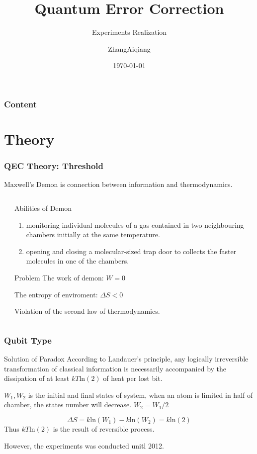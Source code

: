 \documentclass[aspectratio=169,10pt]{beamer}
\title{Quantum Error Correction}
\subtitle{Experiments Realization}
\author{ZhangAiqiang}
\institute{Tsinghua University}
\date{\today}
\begin{document}
\begin{frame}
    \titlepage
\end{frame}
\begin{frame}
    \frametitle{Content}
    \tableofcontents
\end{frame}
\section{Theory}
\begin{frame}
    \frametitle{QEC Theory: Threshold}
    Maxwell's Demon is connection between information and thermodynamics.
    \begin{columns}
        \begin{column}{0.35\textwidth}
        \end{column}
        \begin{column}{0.7\textwidth}
            \begin{block}{Abilities of Demon}
            \begin{enumerate}
                \item monitoring individual molecules of a gas contained in two neighbouring chambers initially at the same temperature.
                \item opening and closing a molecular-sized trap door to collects the faster molecules in one of the chambers.
            \end{enumerate}
        \end{block}


        \begin{block}{Problem}
            The work of demon: $ W = 0 $

            The entropy of enviroment: $\Delta S<0$

            Violation of the second law of thermodynamics.
        \end{block}
        \end{column}
    \end{columns}
\end{frame}
\begin{frame}
    \frametitle{Qubit Type}

    \begin{block}{Solution of Paradox}
        According to Landauer's principle, any logically irreversible transformation of classical information
        is necessarily accompanied by the dissipation of at least $kT\mathrm{ln(2)}$ of heat per lost bit.
    
        $W_1,W_2$ is the initial and final states of system, when an atom is limited in half of chamber, the states number will decrease. $W_2=W_1/2$
        
        \[\Delta S=k\mathrm{ln}(W_1)-k\mathrm{ln}(W_2)=k\mathrm{ln(2)}\]
        Thus $kT\mathrm{ln(2)}$ is the result of reversible process.
    \end{block}
    However, the experiments was conducted unitl 2012.
\end{frame}
\end{document}
